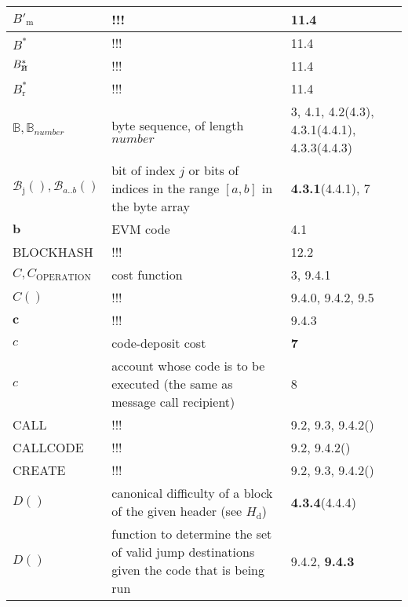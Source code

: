 \documentclass[9pt,oneside]{amsart}
\newcommand{\hcancel}[1]{%
    \tikz[baseline=(tocancel.base)]{
        \node[inner sep=0pt,outer sep=0pt] (tocancel) {#1};
        \draw[black] (tocancel.south west) -- (tocancel.north east);
    }%
}%
\newcommand{\reff}[1]{{\footnotesize #1}}
\begin{document}
\begin{longtabu}{X[1.2lm] X[3] X}
$B'_{\mathrm{m}}$ &
!!! &
\reff{11.4} \\\hline

$B^*$ &
!!! &
\reff{11.4} \\\hline

$B^*_{\hcancel{n}}$ &
!!! &
\reff{11.4} \\\hline

$B^*_{\mathrm{r}}$ &
!!! &
\reff{11.4} \\\hline

$\mathbb{B}, \mathbb{B}_{number}$ &
byte sequence, of length $number$ &
\reff{3, 4.1, 4.2(4.3), 4.3.1(4.4.1), 4.3.3(4.4.3)} \\\hline

$\mathcal{B}_{\mathrm{j}}(), \mathcal{B}_{a..b}()$ &
bit of index $j$ or bits of indices in the range $[a, b]$ in the byte array &
\reff{\textbf{4.3.1}(4.4.1), 7} \\\hline

$\mathbf{b}$ &
EVM code &
\reff{4.1} \\\hline

{\small BLOCKHASH} &
!!! &
\reff{12.2} \\\hline

$C, C_\text{OPERATION}$ &
cost function &
\reff{3, 9.4.1} \\\hline

$C()$ &
!!! &
\reff{9.4.0, 9.4.2, 9.5} \\\hline

$\mathbf{c}$ &
!!! &
\reff{9.4.3} \\\hline

$c$ &
code-deposit cost &
\reff{\textbf{7}} \\\hline

$c$ &
account whose code is to be executed (the same as message call recipient) &
\reff{8} \\\hline

{\small CALL} &
!!! &
\reff{9.2, 9.3, 9.4.2()} \\\hline

{\small CALLCODE} &
!!! &
\reff{9.2, 9.4.2()} \\\hline

{\small CREATE} &
!!! &
\reff{9.2, 9.3, 9.4.2()} \\\hline

$D()$ &
canonical difficulty of a block of the given header (see $H_{\mathrm{d}}$) &
\reff{\textbf{4.3.4}(4.4.4)} \\\hline

$D()$ &
function to determine the set of valid jump destinations given the code that is being run &
\reff{9.4.2, \textbf{9.4.3}} \\\hline


\end{longtabu}
\end{document}
